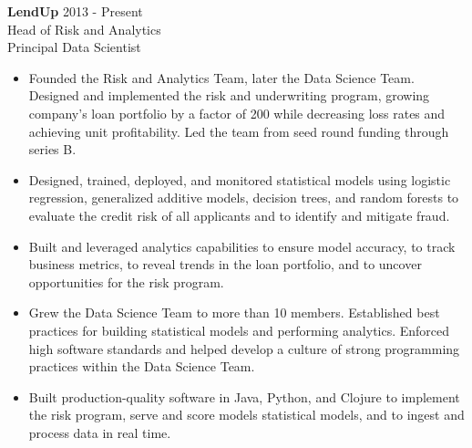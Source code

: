\documentclass[9pt]{article}
\newenvironment{changemargin}[2]{%
  \begin{list}{}{%
    \setlength{\topsep}{0pt}%
    \setlength{\leftmargin}{#1}%
    \setlength{\rightmargin}{#2}%
    \setlength{\listparindent}{\parindent}%
    \setlength{\itemindent}{\parindent}%
    \setlength{\parsep}{\parskip}%
  }%
  \item[]}{\end{list}
}
\newenvironment{body} {
  \vspace*{-16pt}
\begin{changemargin}{-0.25in}{-0.5in}
  }
{\end{changemargin}
}
\begin{document}
\begin{body}

  \vspace{14pt}

  \textbf{LendUp} \hfill 2013 - Present \\
  Head of Risk and Analytics \\
  Principal Data Scientist
  \begin{itemize}


    \item Founded the Risk and Analytics Team, later the Data Science Team.  Designed and implemented the risk and underwriting program, growing company's loan portfolio by a factor of 200 while decreasing loss rates and achieving unit profitability.  Led the team from seed round funding through series B. \\

    \item Designed, trained, deployed, and monitored statistical models using logistic regression, generalized additive models, decision trees, and random forests to evaluate the credit risk of all applicants and to identify and mitigate fraud. \\

    \item Built and leveraged analytics capabilities to ensure model accuracy, to track business metrics, to reveal trends in the loan portfolio, and to uncover opportunities for the risk program. %

    \item Grew the Data Science Team to more than 10 members. Established best practices for building statistical models and performing analytics.  Enforced high software standards and helped develop a culture of strong programming practices within the Data Science Team. \\

    \item Built production-quality software in Java, Python, and Clojure to implement the risk program, serve and score models statistical models, and to ingest and process data in real time. \\


\end{itemize}
\end{body}
\end{document}
